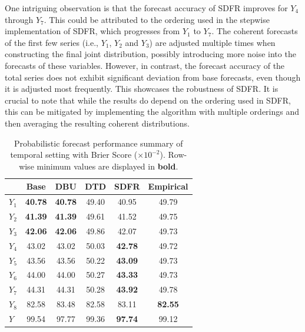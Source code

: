 \documentclass[a4paper,review,11pt,authoryear]{elsarticle}
\theoremstyle{definition}
\begin{document}
     One intriguing observation is that the forecast accuracy of SDFR improves for $Y_4$ through $Y_7$.
     This could be attributed to the ordering used in the stepwise implementation of SDFR, which progresses from $Y_1$ to $Y_7$. The coherent forecasts of the first few series (i.e., $Y_1$, $Y_2$ and $Y_3$) are adjusted multiple times when constructing the final joint distribution, possibly introducing more noise into the forecasts of these variables. However, in contrast, the forecast accuracy of the total series does not exhibit significant deviation from base forecasts,  even though it is adjusted most frequently. This showcases the robustness of SDFR. It is crucial to note that while the results do depend on the ordering used in SDFR, this can be mitigated by implementing the algorithm with multiple orderings and then averaging the resulting coherent distributions.

     \begin{table}
     \centering
     \caption{\label{tab:sim_temporal_res_dist} Probabilistic forecast performance summary of temporal setting with Brier Score ($\times 10^{-2}$). Row-wise minimum values are displayed in \textbf{bold}.}
     \begin{tabular}{lccccc}
     \toprule
      & Base & DBU & DTD & SDFR & Empirical \\\midrule
      $Y_1$ & \textbf{40.78} & \textbf{40.78} & 49.40 & 40.95 & 49.79 \\ 
      $Y_2$ & \textbf{41.39} & \textbf{41.39} & 49.61 & 41.52 & 49.75 \\ 
      $Y_3$ & \textbf{42.06} & \textbf{42.06} & 49.86 & 42.07 & 49.73 \\ 
      $Y_4$ & 43.02 & 43.02 & 50.03 & \textbf{42.78} & 49.72 \\ 
      $Y_5$ & 43.56 & 43.56 & 50.22 & \textbf{43.09} & 49.73 \\ 
      $Y_6$ & 44.00 & 44.00 & 50.27 & \textbf{43.33} & 49.73 \\ 
      $Y_7$ & 44.31 & 44.31 & 50.28 & \textbf{43.92} & 49.78 \\ 
      $Y_8$ & 82.58 & 83.48 & 82.58 & 83.11 & \textbf{82.55} \\ 
      $Y$ & 99.54 & 97.77 & 99.36 & \textbf{97.74} & 99.12 \\ 
     \bottomrule
     \end{tabular}
     \end{table}
\end{document}

